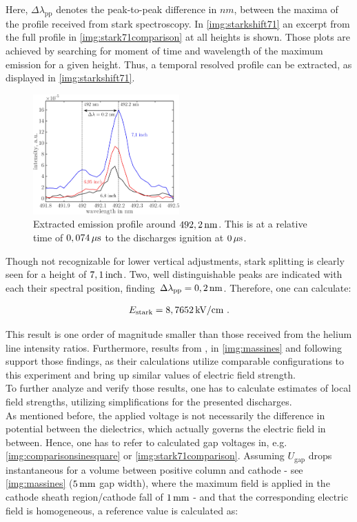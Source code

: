 \documentclass[a4paper,10pt,twoside]{article}
\newcommand{\ix}[1]{_\text{#1}}
\begin{document}
		Here, $\Delta\lambda\ix{pp}$ denotes the peak-to-peak difference in $\unit{nm}$, between the maxima of the profile received from stark spectroscopy. In \autoref{img:starkshift71} an excerpt from the full profile in \autoref{img:stark71comparison} at all heights is shown. Those plots are achieved by searching for moment of time and wavelength of the maximum emission for a given height. Thus, a temporal resolved profile can be extracted, as displayed in \autoref{img:starkshift71}.
		
			\begin{figure}[t!]
				\centering
				\includegraphics[width=0.5\textwidth]{figures/stark/combinations/stark_shiftallheights.pdf}
				\caption{Extracted emission profile around $\unit[492,2]{nm}$. This is at a relative time of $\unit[0,074]{\mu s}$ to the discharges ignition at $\unit[0]{\mu s}$.}
				\label{img:starkshift71}
			\end{figure}
		
		Though not recognizable for lower vertical adjustments, stark splitting is clearly seen for a height of $\unit[7,1]{inch}$. Two, well distinguishable peaks are indicated with each their spectral position, finding $\Delta\lambda\ix{pp}=\unit[0,2]{nm}$. Therefore, one can calculate:
		
			\begin{align}
				E\ix{stark}=\unit[8,7652]{kV/cm} \,\,.\nonumber
			\end{align}
		
		This result is one order of magnitude smaller than those received from the helium line intensity ratios. Furthermore, results from \cite{Massines}, \cite{0022-3727-36-1-306} in \autoref{img:massines} and following support those findings, as their calculations utilize comparable configurations to this experiment and bring up similar values of electric field strength.\\
		To further analyze and verify those results, one has to calculate estimates of local field strengths, utilizing simplifications for the presented discharges.\\
		As mentioned before, the applied voltage is not necessarily the difference in potential between the dielectrics, which actually governs the electric field in between. Hence, one has to refer to calculated gap voltages in, e.g. \autoref{img:comparisonsinesquare} or \autoref{img:stark71comparison}. Assuming $U\ix{gap}$  drops instantaneous for a volume between positive column and cathode - see \autoref{img:massines} ($\unit[5]{mm}$ gap width), where the maximum field is applied in the cathode sheath region/cathode fall of $\unit[1]{mm}$ - and that the corresponding electric field is homogeneous, a reference value is calculated as:
		
\end{document}
